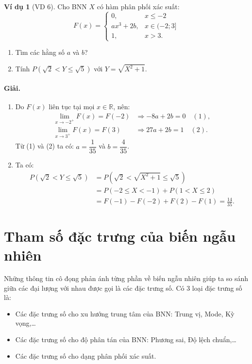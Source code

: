 \documentclass[12pt,a4paper]{article}
\theoremstyle{definition}
\newtheorem{vidu}{Ví dụ}[section]
\begin{document}
\begin{vidu}[VD 6]
Cho BNN $X$ có hàm phân phối xác suất:
\[
F(x) = \begin{cases}
0, & x \le -2 \\
ax^3 + 2b, & x \in (-2; 3] \\
1, & x > 3.
\end{cases}
\]
\begin{enumerate}[label=\arabic*)]
    \item Tìm các hằng số $a$ và $b$?
    \item Tính $P(\sqrt{2} < Y \le \sqrt{5})$ với $Y = \sqrt{X^2 + 1}$.
\end{enumerate}

\paragraph{Giải.}
\begin{enumerate}[label=\arabic*)]
    \item Do $F(x)$ liên tục tại mọi $x \in \mathbb{R}$, nên:
    \begin{align*}
    \lim_{x \to -2^+} F(x) = F(-2) &\Rightarrow -8a + 2b = 0 \quad (1), \\
    \lim_{x \to 3^+} F(x) = F(3) &\Rightarrow 27a + 2b = 1 \quad (2).
    \end{align*}
    Từ (1) và (2) ta có: $a = \dfrac{1}{35}$ và $b = \dfrac{4}{35}$.

    \item Ta có:
    \begin{align*}
    P(\sqrt{2} < Y \le \sqrt{5}) &= P\left(\sqrt{2} < \sqrt{X^2 + 1} \le \sqrt{5}\right) \\
    &= P(-2 \le X < -1) + P(1 < X \le 2) \\
    &= F(-1) - F(-2) + F(2) - F(1) = \frac{14}{35}.
    \end{align*}
\end{enumerate}
\end{vidu}

\section{Tham số đặc trưng của biến ngẫu nhiên}

Những thông tin cô đọng phản ánh từng phần về biến ngẫu nhiên giúp ta so sánh giữa các đại lượng với nhau được gọi là các đặc trưng số. Có 3 loại đặc trưng số là:
\begin{itemize}
    \item Các đặc trưng số cho xu hướng trung tâm của BNN: Trung vị, Mode, Kỳ vọng,\dots
    \item Các đặc trưng số cho độ phân tán của BNN: Phương sai, Độ lệch chuẩn,\dots
    \item Các đặc trưng số cho dạng phân phối xác suất.
\end{itemize}
\end{document}
